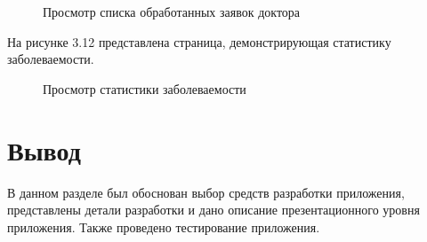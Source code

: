 \begin{figure}[!h]
	\caption{Просмотр списка обработанных заявок доктора}
\end{figure}

На рисунке 3.12 представлена страница, демонстрирующая статистику заболеваемости.

\begin{figure}[!h]
	\caption{Просмотр статистики заболеваемости}
\end{figure}

\section*{Вывод}

В данном разделе был обоснован выбор средств разработки приложения, представлены детали разработки и дано описание презентационного уровня приложения. Также проведено тестирование приложения.